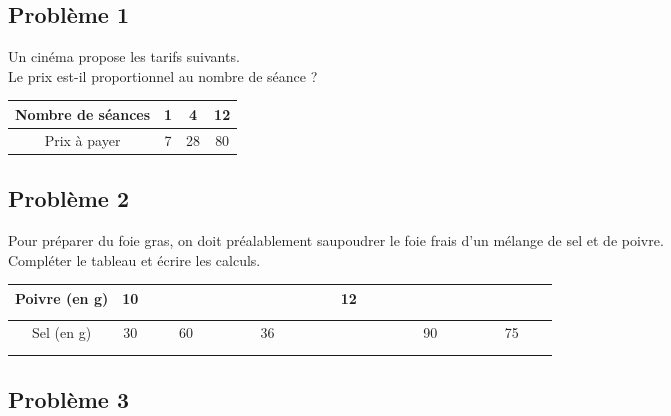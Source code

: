 \Pointilles[5]


\newpage

\subsection*{Problème 1}

\begin{multicols}{2}\noindent

Un cinéma propose les tarifs suivants. \\
Le prix est-il proportionnel au nombre de séance ?


\begin{center}\begin{tabular}{|c|c|c|c|} \hline
  Nombre de séances & 1 &  4 & 12 \\  \hline
  Prix à payer      & 7 & 28 & 80\\  \hline
\end{tabular}\end{center}  \columnbreak 

\Pointilles[5] 

\end{multicols}

\subsection*{Problème 2}

Pour préparer du foie gras, on doit préalablement saupoudrer le foie frais d'un mélange de sel et de poivre. \\
Compléter le tableau et écrire les calculs.

\begin{center}\begin{tabular}{|c|c|c|c|c|c|c|} \hline
  Poivre (en g) & 10 &  $\phantom{\dfrac{azertyuiop}{O}}$  &   $\phantom{\dfrac{azertyuiop}{O}}$ & 12 &  $\phantom{\dfrac{azertyuiop}{O}}$  &  $\phantom{\dfrac{azertyuiop}{O}}$  \\  \hline
  Sel (en g)    & 30 & 60 & 36 &  $\phantom{\dfrac{azertyuiop}{O}}$  & 90 & 75 \\  \hline
\end{tabular}\end{center}

\Pointilles[5] 

\subsection*{Problème 3}

